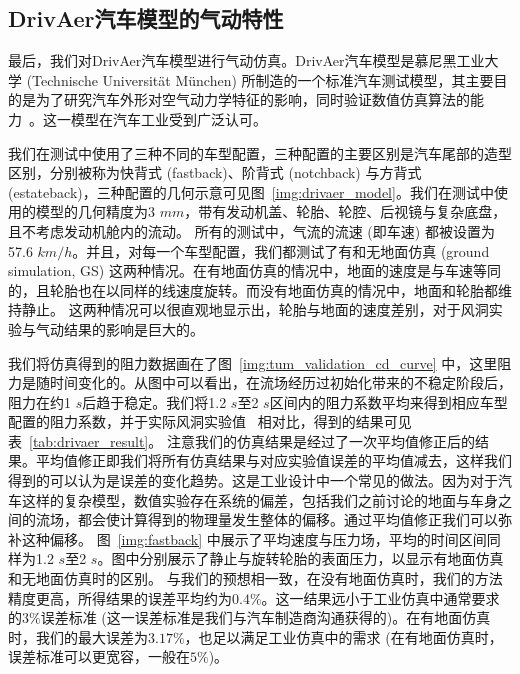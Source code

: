\subsection{DrivAer汽车模型的气动特性}
最后，我们对DrivAer汽车模型进行气动仿真。DrivAer汽车模型是慕尼黑工业大学 (Technische Universit\"at M\"unchen) 所制造的一个标准汽车测试模型，其主要目的是为了研究汽车外形对空气动力学特征的影响，同时验证数值仿真算法的能力~\citep{Heft-2011, Heft-2012}。这一模型在汽车工业受到广泛认可。

我们在测试中使用了三种不同的车型配置，三种配置的主要区别是汽车尾部的造型区别，分别被称为快背式 (fastback)、阶背式 (notchback) 与方背式 (estateback)，三种配置的几何示意可见图~\ref{img:drivaer_model}。我们在测试中使用的模型的几何精度为3 $mm$，带有发动机盖、轮胎、轮腔、后视镜与复杂底盘，且不考虑发动机舱内的流动。
所有的测试中，气流的流速 (即车速) 都被设置为57.6 $km/h$。并且，对每一个车型配置，我们都测试了有和无地面仿真 (ground simulation, GS) 这两种情况。在有地面仿真的情况中，地面的速度是与车速等同的，且轮胎也在以同样的线速度旋转。而没有地面仿真的情况中，地面和轮胎都维持静止。
这两种情况可以很直观地显示出，轮胎与地面的速度差别，对于风洞实验与气动结果的影响是巨大的。

我们将仿真得到的阻力数据画在了图~\ref{img:tum_validation_cd_curve} 中，这里阻力是随时间变化的。从图中可以看出，在流场经历过初始化带来的不稳定阶段后，阻力在约1 $s$后趋于稳定。我们将1.2 $s$至2 $s$区间内的阻力系数平均来得到相应车型配置的阻力系数，并于实际风洞实验值~\citep{Heft-2012b} 相对比，得到的结果可见表~\ref{tab:drivaer_result}。
注意我们的仿真结果是经过了一次平均值修正后的结果。平均值修正即我们将所有仿真结果与对应实验值误差的平均值减去，这样我们得到的可以认为是误差的变化趋势。这是工业设计中一个常见的做法。因为对于汽车这样的复杂模型，数值实验存在系统的偏差，包括我们之前讨论的地面与车身之间的流场，都会使计算得到的物理量发生整体的偏移。通过平均值修正我们可以弥补这种偏移。
图~\ref{img:fastback} 中展示了平均速度与压力场，平均的时间区间同样为1.2 $s$至2 $s$。图中分别展示了静止与旋转轮胎的表面压力，以显示有地面仿真和无地面仿真时的区别。
与我们的预想相一致，在没有地面仿真时，我们的方法精度更高，所得结果的误差平均约为$0.4\%$。这一结果远小于工业仿真中通常要求的$3\%$误差标准 (这一误差标准是我们与汽车制造商沟通获得的)。在有地面仿真时，我们的最大误差为$3.17\%$，也足以满足工业仿真中的需求 (在有地面仿真时，误差标准可以更宽容，一般在$5\%$)。

